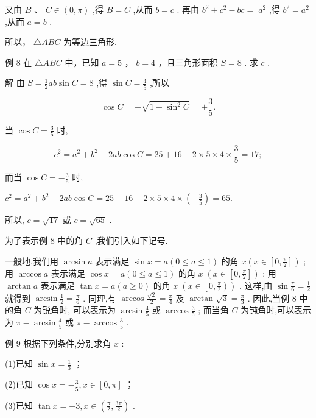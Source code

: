 \documentclass[10pt]{article}
\begin{document}
又由 \(B\text{ 、 }C \in  \left( {0,\pi }\right)\) ,得 \(B = C\) ,从而 \(b = c\) . 再由 \({b}^{2} + {c}^{2} - {bc} = \; {a}^{2}\) ,得 \({b}^{2} = {a}^{2}\) ,从而 \(a = b\) .

所以， \(\bigtriangleup  {ABC}\) 为等边三角形.

例 8 在 \(\bigtriangleup  {ABC}\) 中，已知 \(a = 5\) ， \(b = 4\) ，且三角形面积 \(S = 8\) . 求 \(c\) .

解 由 \(S = \frac{1}{2}{ab}\sin C = 8\) ,得 \(\sin C = \frac{4}{5}\) ,所以

\[
\cos C =  \pm  \sqrt{1 - {\sin }^{2}C} =  \pm  \frac{3}{5}.
\]

当 \(\cos C = \frac{3}{5}\) 时,

\[
{c}^{2} = {a}^{2} + {b}^{2} - {2ab}\cos C = {25} + {16} - 2 \times  5 \times  4 \times  \frac{3}{5} = {17};
\]

而当 \(\cos C =  - \frac{3}{5}\) 时,

\({c}^{2} = {a}^{2} + {b}^{2} - {2ab}\cos C = {25} + {16} - 2 \times  5 \times  4 \times  \left( {-\frac{3}{5}}\right)  = {65}.\)

所以, \(c = \sqrt{17}\) 或 \(c = \sqrt{65}\) .

为了表示例 8 中的角 \(C\) ,我们引入如下记号.

一般地,我们用 \(\arcsin a\) 表示满足 \(\sin x = a\left( {0 \leq  a \leq  1}\right)\) 的角 \(x\left( {x \in  \left\lbrack  {0,\frac{\pi }{2}}\right\rbrack  }\right)\) ; 用 \(\arccos a\) 表示满足 \(\cos x = a\left( {0 \leq  a \leq  1}\right)\) 的角 \(x \; \left( {x \in  \left\lbrack  {0,\frac{\pi }{2}}\right\rbrack  }\right)\) ; 用 \(\arctan a\) 表示满足 \(\tan x = a\left( {a \geq  0}\right)\) 的角 \(x \; \left( {x \in  \left\lbrack  {0,\frac{\pi }{2}}\right) }\right)\) . 这样,由 \(\sin \frac{\pi }{6} = \frac{1}{2}\) 就得到 \(\arcsin \frac{1}{2} = \frac{\pi }{6}\) . 同理,有 \(\arccos \frac{\sqrt{2}}{2} = \frac{\pi }{4}\) 及 \(\arctan \sqrt{3} = \frac{\pi }{3}\) . 因此,当例 8 中的角 \(C\) 为锐角时, 可以表示为 \(\arcsin \frac{4}{5}\) 或 \(\arccos \frac{3}{5}\) ; 而当角 \(C\) 为钝角时,可以表示为 \(\pi  - \arcsin \frac{4}{5}\) 或 \(\pi  - \arccos \frac{3}{5}\) .

例 9 根据下列条件,分别求角 \(x\) :

(1)已知 \(\sin x = \frac{1}{3}\) ；

(2)已知 \(\cos x =  - \frac{3}{5},x \in  \left\lbrack  {0,\pi }\right\rbrack\) ；

(3)已知 \(\tan x =  - 3,x \in  \left( {\frac{\pi }{2},\frac{3\pi }{2}}\right)\) .
\end{document}
